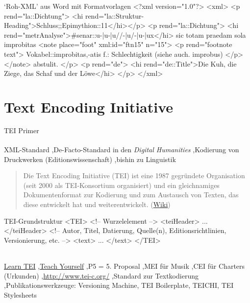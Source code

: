 \begin{myxml}{`Roh-XML' aus Word mit Formatvorlagen}
<?xml version="1.0"?>
<xml>
    <p rend="la::Dichtung">
        <hi rend="la::Struktur-Heading">Schluss;;Epimythion::11</hi></p>
    <p rend="la::Dichtung">
        <hi rend="metrAnalyse">#senar::u-|u-|u//-|u/-|u-|ux</hi>
        sic totam praedam sola improbitas
        <note place="foot" xml:id="ftn15" n="15">
            <p rend="footnote text">
                Vokabel::improbitas,-atis f.: Schlechtigkeit (siehe auch. improbus)
            </p>
        </note>
        abstulit. 
    </p>
    <p rend="de">
        <hi rend="de::Title">Die Kuh, die Ziege, das Schaf und der Löwe</hi>
    </p>
</xml>
\end{myxml}


\section{Text Encoding Initiative}
\begin{frame}{TEI Primer}
\footnotesize
{}\\
\\
XML-Standard \sep De-Facto-Standard in den \emph{Digital Humanities} \sep Kodierung von Druckwerken (Editionswissenschaft) \sep bishin zu Linguistik
\begin{quote}
    Die Text Encoding Initiative (TEI) ist eine 1987 gegründete Organisation (seit 2000 als TEI-Konsortium organisiert) und ein gleichnamiges Dokumentenformat zur Kodierung und zum Austausch von Texten, das diese entwickelt hat und weiterentwickelt.  (\href{https://de.wikipedia.org/wiki/Text_Encoding_Initiative}{Wiki})
\end{quote}

\begin{myxml}{TEI-Grundstruktur}
<TEI> <!-- Wurzelelement -->
    <teiHeader> ... </teiHeader> <!-- Autor, Titel, Datierung, Quelle(n), Editionsrichtlinien,
Versionierung, etc. -->
    <text> ... </text>
</TEI>
\end{myxml}
\smallskip

\\
\href{http://www.tei-c.org/Support/Learn/}{Learn TEI} \sep \href{http://www.tei-c.org/support/learn/teach-yourself-tei/}{Teach Yourself} \sep P5 = 5. Proposal \sep MEI für Musik \sep CEI für Charters (Urkunden) \sep \href{http://www.tei-c.org/}{http://www.tei-c.org/} \sep Standard zur Textkodierung \sep Publikationswerkzeuge: Versioning Machine, TEI Boilerplate, TEICHI, TEI
Stylesheets 
\end{frame}

